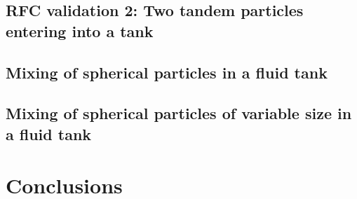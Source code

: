 \documentclass[preprint,12pt]{elsarticle}
\begin{document}
\FloatBarrier%
\subsection{RFC validation 2: Two tandem particles entering into a tank}
\label{sec:rfc_validation_2_single_particle_entry}



\FloatBarrier%
\subsection{Mixing of spherical particles in a fluid tank}
\label{sec:mixing-spherical-particles-in-fluid-tank}



\FloatBarrier%
\subsection{Mixing of spherical particles of variable size in a fluid tank}
\label{sec:mixing-spherical-particles-in-fluid-tank}



\FloatBarrier%
\section{Conclusions}
\label{sec:conclusions}






\end{document}
